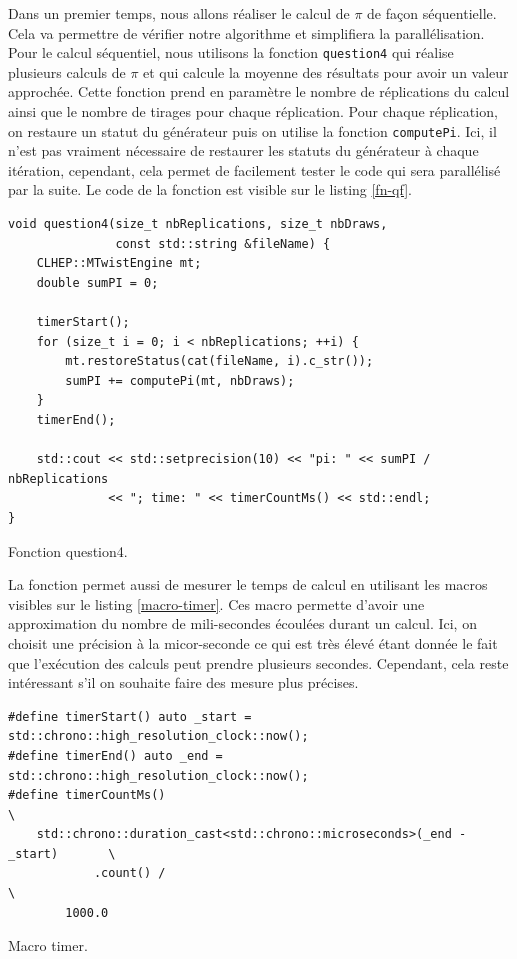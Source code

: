 \documentclass[a4paper]{article}
\begin{document}
Dans un premier temps, nous allons réaliser le calcul de $\pi$ de façon
séquentielle. Cela va permettre de vérifier notre algorithme et simplifiera la
parallélisation.\\

Pour le calcul séquentiel, nous utilisons la fonction \lstinline{question4} qui
réalise plusieurs calculs de $\pi$ et qui calcule la moyenne des résultats pour
avoir un valeur approchée. Cette fonction prend en paramètre le nombre de
réplications du calcul ainsi que le nombre de tirages pour chaque réplication.
Pour chaque réplication, on restaure un statut du générateur puis on utilise la
fonction \lstinline{computePi}. Ici, il n'est pas vraiment nécessaire de
restaurer les statuts du générateur à chaque itération, cependant, cela permet
de facilement tester le code qui sera parallélisé par la suite. Le code de la
fonction est visible sur le listing \ref{fn-qf}.

\begin{listing}[ht!]
\begin{verbatim}
void question4(size_t nbReplications, size_t nbDraws,
               const std::string &fileName) {
    CLHEP::MTwistEngine mt;
    double sumPI = 0;

    timerStart();
    for (size_t i = 0; i < nbReplications; ++i) {
        mt.restoreStatus(cat(fileName, i).c_str());
        sumPI += computePi(mt, nbDraws);
    }
    timerEnd();

    std::cout << std::setprecision(10) << "pi: " << sumPI / nbReplications
              << "; time: " << timerCountMs() << std::endl;
}
\end{verbatim}
\caption{Fonction question4.}
\label{fn-qf}
\end{listing}

La fonction permet aussi de mesurer le temps de calcul en utilisant les macros
visibles sur le listing \ref{macro-timer}. Ces macro permette d'avoir une
approximation du nombre de mili-secondes écoulées durant un calcul. Ici, on
choisit une précision à la micor-seconde ce qui est très élevé étant donnée le
fait que l'exécution des calculs peut prendre plusieurs secondes. Cependant,
cela reste intéressant s'il on souhaite faire des mesure plus précises.

\begin{listing}[ht!]
\begin{verbatim}
#define timerStart() auto _start = std::chrono::high_resolution_clock::now();
#define timerEnd() auto _end = std::chrono::high_resolution_clock::now();
#define timerCountMs()                                                         \
    std::chrono::duration_cast<std::chrono::microseconds>(_end - _start)       \
            .count() /                                                         \
        1000.0
\end{verbatim}
\caption{Macro timer.}
\label{macro-timer}
\end{listing}
\end{document}
